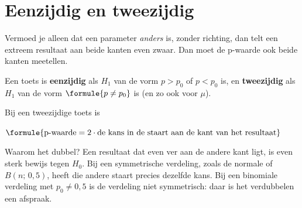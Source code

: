 
\begin{oefeningen}
\end{oefeningen}

\section{Eenzijdig en tweezijdig}

Vermoed je alleen dat een parameter \textit{anders} is, zonder richting, dan telt een extreem resultaat aan beide kanten even zwaar. Dan moet de p-waarde ook beide kanten meetellen.

\begin{theorie}
Een toets is \textbf{\textcolor{accent}{eenzijdig}} als $H_1$ van de vorm $p > p_0$ of $p < p_0$ is, en \textbf{\textcolor{accent}{tweezijdig}} als $H_1$ van de vorm $\formule{p \neq p_0}$ is (en zo ook voor $\mu$).

\vspace{1mm}
Bij een tweezijdige toets is

\vspace{1mm}
\qquad $\formule{\text{p-waarde} = 2 \cdot \text{de kans in de staart aan de kant van het resultaat}}$
\end{theorie}

Waarom het dubbel? Een resultaat dat even ver aan de andere kant ligt, is even sterk bewijs tegen $H_0$. Bij een symmetrische verdeling, zoals de normale of $B(n;\, 0{,}5)$, heeft die andere staart precies dezelfde kans. Bij een binomiale verdeling met $p_0 \neq 0{,}5$ is de verdeling niet symmetrisch: daar is het verdubbelen een afspraak.



